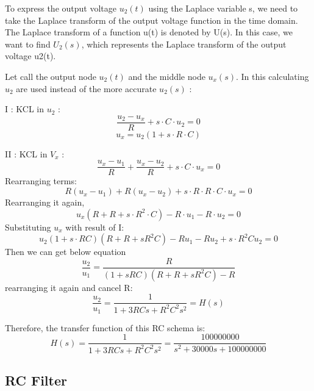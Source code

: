 \documentclass[
	a4paper,
	11pt,
]{article}
\begin{document}
To express the output voltage \(u_2(t)\) using the Laplace variable s, we need to take the Laplace transform of the output voltage function in the time domain. The Laplace transform of a function u(t) is denoted by U(s). In this case, we want to find \(U_2(s)\), which represents the Laplace transform of the output voltage u2(t).


Let call the output node \(u_2(t)\) and the middle node \(u_x(s)\). In this calculating \(u_2\) are used instead of the more accurate \(u_2(s)\) :

I : KCL in \(u_2\) :
\begin{equation}
    \frac{u_2 - u_x}{R} + s\cdot C\cdot u_2 = 0
\end{equation}
\begin{equation}
    u_x = u_2 (1 + s\cdot R\cdot C)
\end{equation}

II : KCL in \(V_x\) :
\begin{equation}
    \frac{u_x - u_1}{R}+ \frac{u_x - u_2}{R} + s\cdot C \cdot u_x = 0
\end{equation}
Rearranging terms:
\begin{equation}
    R(u_x - u_1) + R(u_x - u_2) + s\cdot R\cdot R\cdot C\cdot u_x = 0
\end{equation}
Rearranging it again,
\begin{equation}
    u_x (R + R + s\cdot R^2 \cdot C) - R\cdot u_1 - R\cdot u_2 = 0 
\end{equation}
Substituting \(u_x\) with result of I:
\begin{equation}
    u_2 (1 + s\cdot RC)(R+R+s R^2 C) - R u_1 - R u_2 + s\cdot R^2 C u_2 = 0
\end{equation}
Then we can get below equation
\begin{equation}
    \frac{u_2}{u_1} = \frac{R}{(1+sRC)(R+R+sR^2C)- R}
\end{equation}
rearranging it again and cancel R:
\begin{equation}
    \frac{u_2}{u_1} = \frac{1}{1+3RCs + R^2C^2s^2} = H(s)
\end{equation}

Therefore, the transfer function of this RC schema is:
\begin{equation}
    H(s) = \frac{1}{1+3RCs + R^2C^2s^2} =  \frac{100000000}{s^2+30000s+100000000}
\end{equation}


\subsection{RC Filter}
\end{document}
